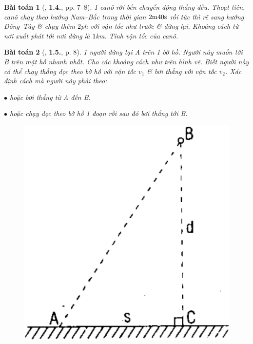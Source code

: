 \documentclass{article}
\numberwithin{equation}{section}
\newtheorem{baitoan}{Bài toán}[section]
\begin{document}
\begin{baitoan}[\cite{Giai_Toan_Vat_Ly_10_tap_1}, \textbf{1.4.}, pp. 7--8]
	1 canô rời bến chuyển động thẳng đều. Thoạt tiên, canô chạy theo hướng Nam--Bắc trong thời gian $\rm 2m40s$ rồi tức thì rẽ sang hướng Đông--Tây \& chạy thêm $2$\emph{ph} với vận tốc như trước \& dừng lại. Khoảng cách từ nơi xuất phát tới nơi dừng là $1$\emph{km}. Tính vận tốc của canô.
\end{baitoan}

\begin{baitoan}[\cite{Giai_Toan_Vat_Ly_10_tap_1}, \textbf{1.5.}, p. 8]
	1 người đứng tại A trên 1 bờ hồ. Người này muốn tới B trên mặt hồ nhanh nhất. Cho các khoảng cách như trên hình vẽ. Biết người này có thể chạy thẳng dọc theo bờ hồ với vận tốc $v_1$ \& bơi thẳng với vận tốc $v_2$. Xác định cách mà người này phải theo:
	\begin{enumerate*}
		\item[$\bullet$] hoặc bơi thẳng từ A đến B.
		\item[$\bullet$] hoặc chạy dọc theo bờ hồ 1 đoạn rồi sau đó bơi thẳng tới B.
	\end{enumerate*}
	
	\begin{figure}[h]
		\centering
		\includegraphics[scale=0.1]{bo_ho}
	\end{figure}
\end{baitoan}
\end{document}
